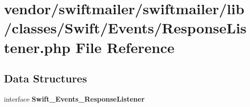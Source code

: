 \section{vendor/swiftmailer/swiftmailer/lib/classes/\+Swift/\+Events/\+Response\+Listener.php File Reference}
\label{swiftmailer_2swiftmailer_2lib_2classes_2_swift_2_events_2_response_listener_8php}
\subsection*{Data Structures}
\begin{DoxyCompactItemize}
\item 
interface {\bf Swift\+\_\+\+Events\+\_\+\+Response\+Listener}
\end{DoxyCompactItemize}
